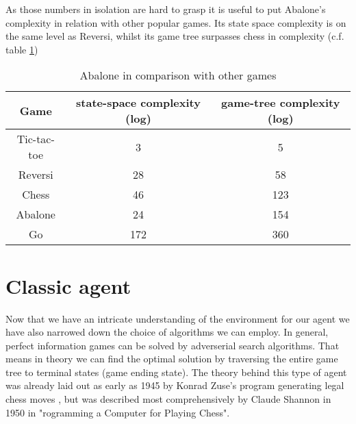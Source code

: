 As those numbers in isolation are hard to grasp it is useful to put Abalone's complexity in relation with other popular games. Its state space complexity is on the same level as Reversi, whilst its game tree surpasses chess in complexity (c.f. table \ref{complexity_table})

\begin{table}
    \begin{center}
        \begin{tabular}{ | c | c | c | }
            \hline
            Game        & state-space complexity (log) & game-tree complexity (log) \\
            \hline
            Tic-tac-toe & 3                            & 5                          \\
            \hline
            Reversi     & 28                           & 58                         \\
            \hline
            Chess       & 46                           & 123                        \\
            \hline
            Abalone     & 24                           & 154                        \\
            \hline
            Go          & 172                          & 360                        \\
            \hline
        \end{tabular}
    \end{center}
    \caption{Abalone in comparison with other games \cite{chorus_implementing_2009}}
    \label{complexity_table}
\end{table}


\section{Classic agent}
Now that we have an intricate understanding of the environment for our agent we have also narrowed down the choice of algorithms we can employ. In general, perfect information games can be solved by adverserial search algorithms. That means in theory we can find the optimal solution by traversing the entire game tree to terminal states (game ending state). The theory behind this type of agent was already laid out as early as 1945 by Konrad Zuse's program generating legal chess moves \cite{knuth_early_1980}, but was described most comprehensively by Claude Shannon in 1950 in "rogramming a Computer for Playing Chess". \cite{shannon_xxii_1950}

